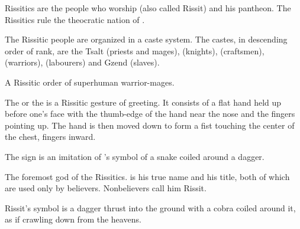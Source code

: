 \begin{gloss}
\begin{comment}
\paragraph{Rissitics}
\end{comment}
Rissitics are the people who worship \HriistN{} (also called Rissit) and his pantheon. 
The Rissitics rule the theocratic nation of . 

\index{\Rekkan}
\index{\Bedhin}
\index{\Kyth}
\index{\Hok}
The Rissitic people are organized in a caste system. 
The castes, in descending order of rank, are the Tsalt (priests and mages), \Rekkan{} (knights), \Bedhin{} (craftsmen), \Kyth{} (warriors), \Hok{} (labourers) and Gzend (slaves). 






\begin{subgloss}
  \begin{comment}
  \subparagraph{\Ashenoch}
  \end{comment}
  A Rissitic order of superhuman warrior-mages. 




  \begin{comment}
  \subparagraph{dagger sign}
  \end{comment}
  The  or the  is a Rissitic gesture of greeting. 
  It consists of a flat hand held up before one's face with the thumb-edge of the hand near the nose and the fingers pointing up. 
  The hand is then moved down to form a fist touching the center of the chest, fingers inward. 
  
  The sign is an imitation of 's symbol of a snake coiled around a dagger. 
  
  
  
  
  \begin{comment}
  \subparagraph{\HriistN}
  \end{comment}
  \index{\Nechsain}
  The foremost god of the {Rissitics}. \Hriist{} is his true name and \Nechsain{} his title, both of which are used only by believers. Nonbelievers call him Rissit. 
  
  Rissit's symbol is a dagger thrust into the ground with a cobra coiled around it, as if crawling down from the heavens. 
\end{subgloss}








\end{gloss}
